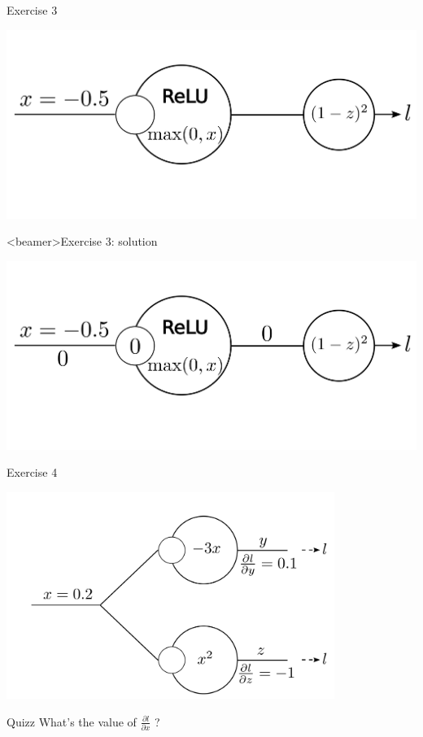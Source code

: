 \documentclass[xcolor=pdftex,dvipsnames,table,mathserif]{beamer}
\begin{document}
\begin{frame}{Exercise 3}

  \includegraphics[width=\textwidth]{bp_relu_exo2.png}

\end{frame}

\begin{frame}<beamer>{Exercise 3: solution}

  \includegraphics[width=\textwidth]{bp_relu_exo2_sol.png}

\end{frame}


\begin{frame}{Exercise 4}

  \includegraphics[width=0.8\textwidth]{bp_split.png}

  \begin{block}{Quizz}
    What's the value of  $\frac{\partial l}{\partial x}$ ?
  \end{block}

\end{frame}
\end{document}
